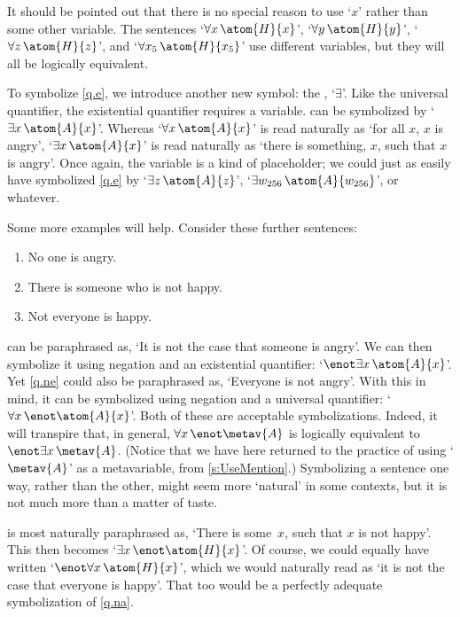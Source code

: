 It should be pointed out that there is no special reason to use `$x$'
rather than some other variable. The sentences `$\forall x\,
\atom{H}{x}$', `$\forall y\, \atom{H}{y}$', `$\forall z\,
\atom{H}{z}$', and `$\forall x_5\, \atom{H}{x_5}$' use different
variables, but they will all be logically equivalent.

To symbolize \cref{q.e}, we introduce another new symbol: the
, `$\exists$'. Like the universal
quantifier, the existential quantifier requires a variable.
 can be symbolized by `$\exists x\,\atom{A}{x}$'. Whereas
`$\forall x\,\atom{A}{x}$' is read naturally as `for all $x$, $x$ is
angry', `$\exists x\,\atom{A}{x}$' is read naturally as `there is
something, $x$, such that $x$ is angry'. Once again, the variable is a
kind of placeholder; we could just as easily have symbolized
\cref*{q.e} by `$\exists z\, \atom{A}{z}$', `$\exists w_{256}\,
\atom{A}{w_{256}}$', or whatever.


Some more examples will help. Consider these further sentences:
	\begin{enumerate}
		\item\label{q.ne} No one is angry.
		\item\label{q.en} There is someone who is not happy.
		\item\label{q.na} Not everyone is happy.
	\end{enumerate}
 can be paraphrased as, `It is not the case that someone is angry'. We can then symbolize it using negation and an existential quantifier: `$\enot \exists x\,\atom{A}{x}$'. Yet \cref*{q.ne} could also be paraphrased as, `Everyone is not angry'. With this in mind, it can be symbolized using negation and a universal quantifier: `$\forall x\, \enot \atom{A}{x}$'. Both of these are acceptable symbolizations.  Indeed, it will transpire that, in general, $\forall x\, \enot\metav{A}$ is logically equivalent to $\enot\exists x\,\metav{A}$. (Notice that we have here returned to the practice of using `$\metav{A}$' as a metavariable, from \cref{s:UseMention}.) Symbolizing a sentence one way, rather than the other, might seem more `natural' in some contexts, but it is not much more than a matter of taste.

 is most naturally paraphrased as, `There is some~$x$, such that $x$ is not happy'. This then becomes `$\exists x\, \enot \atom{H}{x}$'. Of course, we could equally have written `$\enot\forall x\,\atom{H}{x}$', which we would naturally read as `it is not the case that everyone is happy'. That too would be a perfectly adequate symbolization of \cref*{q.na}.


